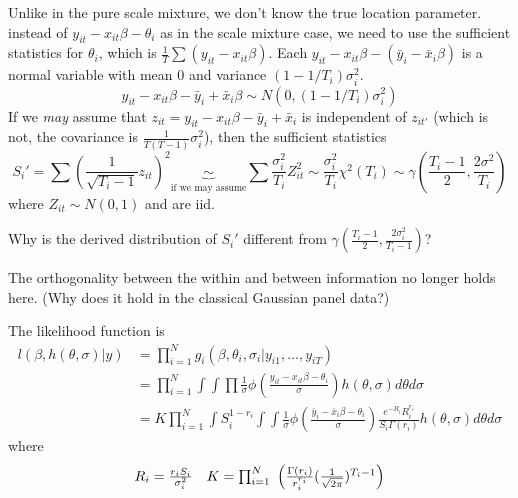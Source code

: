 \begin{remark}
    Unlike in the pure scale mixture, we don't know the true location parameter.
    instead of $y_{it}-x_{it}\beta-\theta_i$ as in the scale mixture case, we need to use the sufficient statistics for $\theta_i$, which is $\frac{1}{T}\sum (y_{it}-x_{it}\beta)$. Each $y_{it}-x_{it}\beta-(\bar{y}_i-\bar{x}_i\beta)$ is a normal variable with mean 0 and variance $(1-1/T_i)\sigma_i^2$.\begin{equation*}
        y_{it}-x_{it}\beta-\bar{y}_i+\bar{x}_i\beta \sim N(0,(1-1/T_i)\sigma_i^2)
    \end{equation*}
    If we \textit{may} assume that $z_{it}=y_{it}-x_{it}\beta-\bar{y}_i+\bar{x}_i$ is independent of $z_{it'}$ (which is not, the covariance is $\frac{1}{T(T-1)}\sigma_i^2$), then the sufficient statistics \begin{equation*}
        S_i'=\sum (\frac{1}{\sqrt{T_i-1}}z_{it})^2 \underbrace{\sim}_{\text{if we may assume}} \sum \frac{\sigma_i^2}{{T_i}}Z_{it}^2 \sim \frac{\sigma_i^2}{T_i}\chi^2(T_i) \sim \gamma(\frac{T_i-1}{2},\frac{2\sigma^2}{T_i})
    \end{equation*} where $Z_{it}\sim N(0,1)$ and are iid.

\end{remark}
\begin{question}
    Why is the derived distribution of $S_i'$ different from $\gamma(\frac{T_i-1}{2},\frac{2\sigma_i^2}{T_i-1})$?
\end{question}
\begin{remark}
    The orthogonality between the within and between information no longer holds here. (Why does it hold in the classical Gaussian panel data?)
\end{remark}
The likelihood function is \begin{equation*}
    \begin{split}
        l(\beta, h(\theta,\sigma)|y)&=\prod_{i=1}^N g_i(\beta,\theta_i,\sigma_i|y_{i1},\ldots,y_{iT})\\
        &=\prod_{i=1}^N\int \int \prod \frac{1}{\sigma} \phi(\frac{y_{it}-x_{it}\beta-\theta_i}{\sigma}) h(\theta,\sigma)d\theta d\sigma\\
        & =K \prod_{i=1}^N\int S_i^{1-r_i}\int\int \frac{1}{\sigma} \phi(\frac{\bar{y}_{i}-\bar{x}_{i}\beta-\theta_i}{\sigma})\frac{e^{-R_i}R_i^{r_i}}{S_i\Gamma(r_i)}h(\theta, \sigma)d\theta d\sigma
    \end{split}
\end{equation*}
where \begin{equation*}
    \begin{array}{ll}
        R_i=\frac{r_iS_i}{\sigma_i^2} & K=\prod_{i=1}^N\ \pa{\frac{\Gamma(r_i)}{r_i^{r_i}}(\frac{1}{\sqrt{2\pi}})^{T_i-1}}
    \end{array}
\end{equation*}

